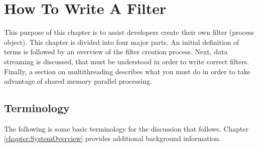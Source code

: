 \chapter{How To Write A Filter}
\label{chapter:WriteAFilter}

This purpose of this chapter is to assist developers create their own filter
(process object).  This chapter is divided into four major parts. An initial
definition of terms is followed by an overview of the filter creation
process. Next, data streaming is discussed, that must be understood in order
to write correct filters. Finally, a section on multithreading describes
what you must do in order to take advantage of shared memory parallel
processing.

\section{Terminology}
\label{sec:Terminology}

The following is some basic terminology for the discussion that follows.
Chapter \ref{chapter:SystemOverview} provides additional background
information.

